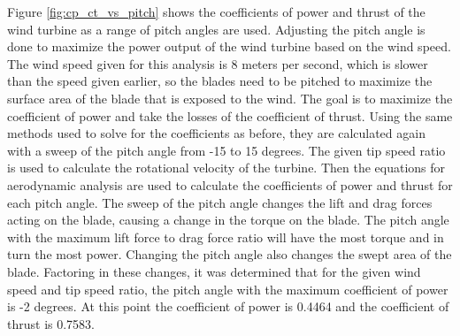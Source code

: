 \documentclass[11pt]{article}
\begin{document}
Figure \ref{fig:cp_ct_vs_pitch} shows the coefficients of power and thrust of the wind turbine as a range of pitch angles are used. Adjusting the pitch angle is done to maximize the power output of the wind turbine based on the wind speed. The wind speed given for this analysis is 8 meters per second, which is slower than the speed given earlier, so the blades need to be pitched to maximize the surface area of the blade that is exposed to the wind. The goal is to maximize the coefficient of power and take the losses of the coefficient of thrust. 
Using the same methods used to solve for the coefficients as before, they are calculated again with a sweep of the pitch angle from -15 to 15 degrees. The given tip speed ratio is used to calculate the rotational velocity of the turbine. Then the equations for aerodynamic analysis are used to calculate the coefficients of power and thrust for each pitch angle. The sweep of the pitch angle changes the lift and drag forces acting on the blade, causing a change in the torque on the blade. The pitch angle with the maximum lift force to drag force ratio will have the most torque and in turn the most power. Changing the pitch angle also changes the swept area of the blade. Factoring in these changes, it was determined that for the given wind speed and tip speed ratio, the pitch angle with the maximum coefficient of power is -2 degrees. At this point the coefficient of power is 0.4464 and the coefficient of thrust is 0.7583.
\end{document}
